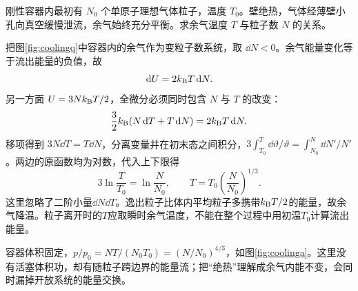 
\begin{example}[刚性绝热容器中的余气冷却]\label{ex:cooling}
刚性容器内最初有 $N_0$ 个单原子理想气体粒子，温度 $T_0$。壁绝热，气体经薄壁小孔向真空缓慢泄流，余气始终充分平衡。求余气温度 $T$ 与粒子数 $N$ 的关系。
\end{example}
\begin{solution}
把图\ref{fig:coolingq}中容器内的余气作为变粒子数系统，取 $\dd N<0$。余气能量变化等于流出能量的负值，故
\[
 \mathop{}\!\mathrm d U=2k_{\mathrm B} T\mathop{}\!\mathrm d N.
\]
另一方面 $U=3Nk_{\mathrm B} T/2$，全微分必须同时包含 $N$ 与 $T$ 的改变：
\[
 \frac32k_{\mathrm B}(N\mathop{}\!\mathrm d T+T\mathop{}\!\mathrm d N)=2k_{\mathrm B} T\mathop{}\!\mathrm d N.
\]
移项得到 $3N\dd T=T\dd N$，分离变量并在初末态之间积分，$3\int_{T_0}^{T}\dd\vartheta/\vartheta=\int_{N_0}^{N}\dd N'/N'$。两边的原函数均为对数，代入上下限得
\[
 3\ln\frac T{T_0}=\ln\frac N{N_0},\qquad
 T=T_0\left(\frac N{N_0}\right)^{1/3}.
\]
这里忽略了二阶小量$\dd N\dd T$。逸出粒子比体内平均粒子多携带$k_{\mathrm B} T/2$的能量，故余气降温。粒子离开时的$T$应取瞬时余气温度，不能在整个过程中用初温$T_0$计算流出能量。

容器体积固定，$p/p_0=NT/(N_0T_0)=(N/N_0)^{4/3}$，如图\ref{fig:coolinga}。这里没有活塞体积功，却有随粒子跨边界的能量流；把“绝热”理解成余气内能不变，会同时漏掉开放系统的能量交换。
\end{solution}

